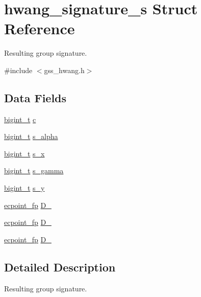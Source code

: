 \hypertarget{structhwang__signature__s}{\section{hwang\-\_\-signature\-\_\-s Struct Reference}
\label{structhwang__signature__s}
}


Resulting group signature.  




{\ttfamily \#include $<$gss\-\_\-hwang.\-h$>$}

\subsection*{Data Fields}
\begin{DoxyCompactItemize}
\item 
\hyperlink{types_8h_a7ae8816fa287bc4a98dec462acd2ad28}{bigint\-\_\-t} \hyperlink{structhwang__signature__s_a7fb1cb6824c1df972043f43d38a6b4ac}{c}
\item 
\hyperlink{types_8h_a7ae8816fa287bc4a98dec462acd2ad28}{bigint\-\_\-t} \hyperlink{structhwang__signature__s_aaa360f917bb1fb233784b0533a3b0d01}{s\-\_\-alpha}
\item 
\hyperlink{types_8h_a7ae8816fa287bc4a98dec462acd2ad28}{bigint\-\_\-t} \hyperlink{structhwang__signature__s_aa90e1e307f33f573f6a5aa2a38297692}{s\-\_\-x}
\item 
\hyperlink{types_8h_a7ae8816fa287bc4a98dec462acd2ad28}{bigint\-\_\-t} \hyperlink{structhwang__signature__s_af0a04dad7e61ce5793dbfb6c775affee}{s\-\_\-gamma}
\item 
\hyperlink{types_8h_a7ae8816fa287bc4a98dec462acd2ad28}{bigint\-\_\-t} \hyperlink{structhwang__signature__s_ae1cae695fcbda6e68a1cb7b87ba789e2}{s\-\_\-y}
\item 
\hyperlink{structecpoint__fp}{ecpoint\-\_\-fp} \hyperlink{structhwang__signature__s_af27fdffc6e81e237f52c3ff916f0b4c8}{D\-\_}
\item 
\hyperlink{structecpoint__fp}{ecpoint\-\_\-fp} \hyperlink{structhwang__signature__s_a80e13d38590e1276886908554a7cd755}{D\-\_}
\item 
\hyperlink{structecpoint__fp}{ecpoint\-\_\-fp} \hyperlink{structhwang__signature__s_aaecc7ad706fa2118065f64c6584f9d12}{D\-\_}
\end{DoxyCompactItemize}


\subsection{Detailed Description}
Resulting group signature. 



